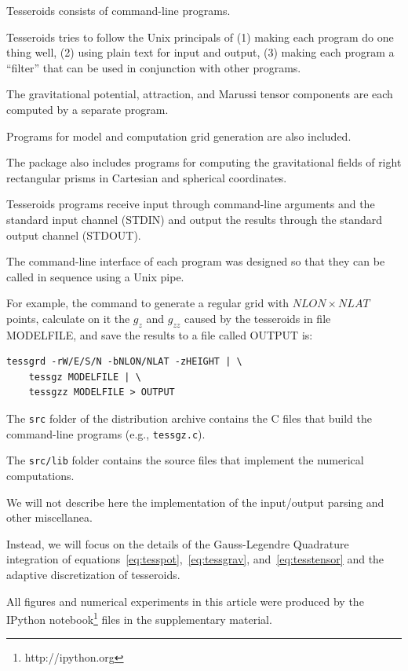 \documentclass[paper,twocolumn]{geophysics}
\begin{document}
Tesseroids consists of command-line programs.

Tesseroids tries to follow the Unix principals of
(1) making each program do one thing well,
(2) using plain text for input and output,
(3) making each program a ``filter'' that can be used in conjunction with other
programs.

The gravitational potential, attraction, and Marussi tensor components
are each computed by a separate program.

Programs for model and computation grid generation are also included.

The package also includes programs for computing the gravitational fields of
right rectangular prisms in Cartesian and spherical coordinates.

Tesseroids programs receive input through command-line arguments and the
standard input channel (STDIN) and output the results through
the standard output channel (STDOUT).

The command-line interface of each program was designed so that they
can be called in sequence using a Unix pipe.

For example, the command to
generate a regular grid with $NLON \times NLAT$ points,
calculate on it the $g_z$ and $g_{zz}$ caused by the tesseroids in file
MODELFILE,
and save the results to a file called OUTPUT
is:

\begin{verbatim}
tessgrd -rW/E/S/N -bNLON/NLAT -zHEIGHT | \
    tessgz MODELFILE | \
    tessgzz MODELFILE > OUTPUT
\end{verbatim}



The \texttt{src} folder of the distribution archive
contains the C files that build the command-line programs
(e.g., \texttt{tessgz.c}).

The \texttt{src/lib} folder contains the source files that implement the
numerical computations.

We will not describe here the implementation of the input/output parsing and
other miscellanea.

Instead, we will focus on the details of the Gauss-Legendre Quadrature
integration of equations~\ref{eq:tesspot},~\ref{eq:tessgrav},
and~\ref{eq:tesstensor}
and the adaptive discretization of tesseroids.



All figures and numerical experiments in this article were produced by the
IPython notebook\footnote{http://ipython.org}
files \citep{Perez2007} in the supplementary material.
\end{document}

